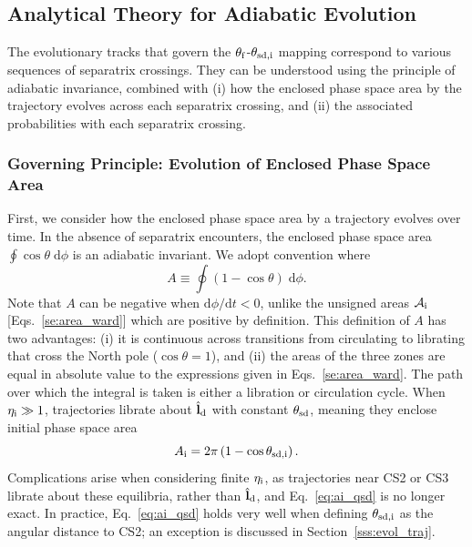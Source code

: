 \documentclass[twocolumn,twocolappendix]{aastex63}
\newcommand*{\rdil}[2]{\mathrm{d}#1 / \mathrm{d}#2}
\newcommand*{\bsmb}[1]{\boldsymbol{\mathbf{#1}}}
\newcommand*{\uv}[1]{\hat{\bsmb{#1}}}
\newcommand*{\p}[1]{\left(#1\right)}
\begin{document}
\subsection{Analytical Theory for Adiabatic Evolution}\label{ss:zone_transitions}

The evolutionary tracks that govern the $\theta_{\rm f}$-$\theta_{\rm sd, i}$
mapping correspond to various sequences of separatrix crossings. They can be
understood using the principle of adiabatic invariance, combined with (i) how
the enclosed phase space area by the trajectory evolves across each separatrix
crossing, and (ii) the associated probabilities with each separatrix crossing.

\subsubsection{Governing Principle: Evolution of Enclosed Phase Space
Area}\label{sss:a_evo}

First, we consider how the enclosed phase space area by a trajectory evolves
over time. In the absence of separatrix encounters, the enclosed phase space
area $\oint \cos\theta \;\mathrm{d}\phi$ is an adiabatic invariant. We adopt
convention where
\begin{equation}
    A \equiv \oint \p{1 - \cos \theta}\;\mathrm{d}\phi.\label{eq:a_oint}
\end{equation}
Note that $A$ can be negative when $\rdil{\phi}{t} < 0$, unlike
the unsigned areas $\mathcal{A}_{\rm i}$ [Eqs.~\eqref{se:area_ward}] which are
positive by definition. This definition
of $A$ has two advantages: (i) it is continuous across transitions from
circulating to librating that cross the North pole ($\cos \theta = 1$), and (ii)
the areas of the three zones are equal in absolute value to the expressions
given in Eqs.~\eqref{se:area_ward}. The path over which the integral is taken is
either a libration or circulation cycle. When $\eta_{\rm i} \gg 1$, trajectories
librate about $\uv{l}_{\rm d}$ with constant $\theta_{\rm sd}$, meaning they
enclose initial phase space area
\begin{equation}
    A_{\rm i} = 2\pi\p{1 - \cos \theta_{\rm sd, i}}.\label{eq:ai_qsd}
\end{equation}
Complications arise when considering finite $\eta_{\rm i}$, as trajectories near
CS2 or CS3 librate about these equilibria, rather than $\uv{l}_{\rm d}$, and
Eq.~\eqref{eq:ai_qsd} is no longer exact. In practice, Eq.~\eqref{eq:ai_qsd}
holds very well when defining $\theta_{\rm sd, i}$ as the angular distance to
CS2; an exception is discussed in Section~\ref{sss:evol_traj}.
\end{document}
